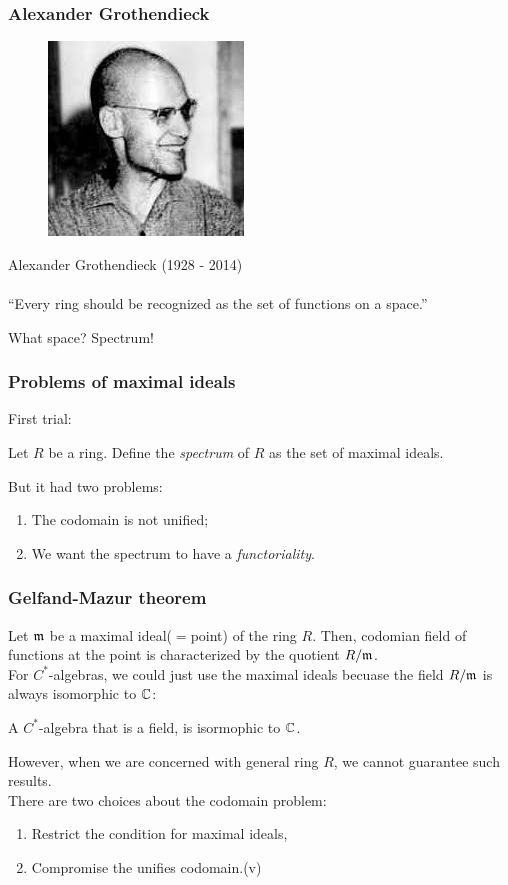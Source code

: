 \documentclass[10pt]{beamer}
\begin{document}
\begin{frame}
\frametitle{Alexander Grothendieck}
  \begin{figure}\includegraphics[scale=.4]{grothendieck.jpeg}\end{figure}
  \begin{center}
  Alexander Grothendieck (1928 - 2014)\\
  \\
  ``Every ring should be recognized as the set of functions on a space.''\\
  \end{center}
  \pause What space? \pause Spectrum!
\end{frame}

\begin{frame}
\frametitle{Problems of maximal ideals}
  First trial:
  \begin{defn}
    Let $R$ be a ring.
    Define the \emph{spectrum} of $R$ as the set of maximal ideals.
  \end{defn}
  \bigskip
  \pause But it had two problems:
  \begin{enumerate}
    \item The codomain is not unified;
    \item We want the spectrum to have a \emph{functoriality}.
  \end{enumerate}
\end{frame}

\begin{frame}
\frametitle{Gelfand-Mazur theorem}
  Let $\mathfrak{m}$ be a maximal ideal($=$point) of the ring $R$.
  Then, codomian field of functions at the point is characterized by the quotient $R/\mathfrak{m}$.\\
  \pause For $C^*$-algebras, we could just use the maximal ideals becuase the field $R/\mathfrak{m}$ is always isomorphic to $\mathbb{C}$:
  \begin{thm}
    A $C^*$-algebra that is a field, is isormophic to $\mathbb{C}$.
  \end{thm}
  \pause However, when we are concerned with general ring $R$, we cannot guarantee such results.\\
  There are two choices about the codomain problem:\pause
  \begin{enumerate}
    \item Restrict the condition for maximal ideals,
    \item Compromise the unifies codomain.\pause (v)
  \end{enumerate}
\end{frame}
\end{document}
